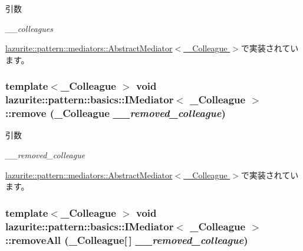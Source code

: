 \begin{DoxyParams}{引数}
\item[{\em \_\-\_\-colleagues}]\end{DoxyParams}


\hyperlink{classlazurite_1_1pattern_1_1mediators_1_1_abstract_mediator_3_01___colleague_01_4_ab8c021c05638b19a8a4c6809740d6198}{lazurite::pattern::mediators::AbstractMediator$<$ \_\-Colleague $>$}で実装されています。\hypertarget{interfacelazurite_1_1pattern_1_1basics_1_1_i_mediator_3_01___colleague_01_4_aaeaaca17d4e64f068539fb68f5049f4a}{
\subsubsection[{remove}]{\setlength{\rightskip}{0pt plus 5cm}template$<$\_\-Colleague $>$ void lazurite::pattern::basics::IMediator$<$ \_\-Colleague $>$::remove (\_\-Colleague {\em \_\-\_\-removed\_\-colleague})}}
\label{interfacelazurite_1_1pattern_1_1basics_1_1_i_mediator_3_01___colleague_01_4_aaeaaca17d4e64f068539fb68f5049f4a}

\begin{DoxyParams}{引数}
\item[{\em \_\-\_\-removed\_\-colleague}]\end{DoxyParams}


\hyperlink{classlazurite_1_1pattern_1_1mediators_1_1_abstract_mediator_3_01___colleague_01_4_a601e9d6ee36d72f455ebc9c95e7b0000}{lazurite::pattern::mediators::AbstractMediator$<$ \_\-Colleague $>$}で実装されています。\hypertarget{interfacelazurite_1_1pattern_1_1basics_1_1_i_mediator_3_01___colleague_01_4_a9ddd29033f71ca3f8b5e15a1ac9de5ff}{
\subsubsection[{removeAll}]{\setlength{\rightskip}{0pt plus 5cm}template$<$\_\-Colleague $>$ void lazurite::pattern::basics::IMediator$<$ \_\-Colleague $>$::removeAll (\_\-Colleague\mbox{[}$\,$\mbox{]} {\em \_\-\_\-removed\_\-colleague})}}
\label{interfacelazurite_1_1pattern_1_1basics_1_1_i_mediator_3_01___colleague_01_4_a9ddd29033f71ca3f8b5e15a1ac9de5ff}

